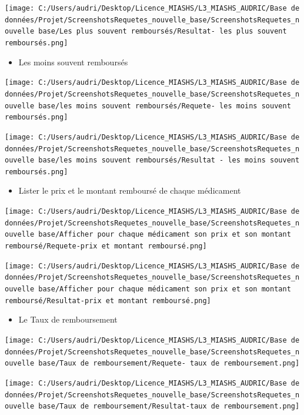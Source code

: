 \documentclass[mstat,12pt]{unswthesis}
\begin{document}
\texttt{[image: C:/Users/audri/Desktop/Licence\_MIASHS/L3\_MIASHS\_AUDRIC/Base de données/Projet/ScreenshotsRequetes\_nouvelle\_base/ScreenshotsRequetes\_nouvelle base/Les plus souvent remboursés/Resultat- les plus souvent remboursés.png]}

\begin{itemize}
\tightlist
\item
  Les moins souvent remboursés
\end{itemize}

\texttt{[image: C:/Users/audri/Desktop/Licence\_MIASHS/L3\_MIASHS\_AUDRIC/Base de données/Projet/ScreenshotsRequetes\_nouvelle\_base/ScreenshotsRequetes\_nouvelle base/les moins souvent remboursés/Requete- les moins souvent remboursés.png]}
\bigskip

\texttt{[image: C:/Users/audri/Desktop/Licence\_MIASHS/L3\_MIASHS\_AUDRIC/Base de données/Projet/ScreenshotsRequetes\_nouvelle\_base/ScreenshotsRequetes\_nouvelle base/les moins souvent remboursés/Resultat - les moins souvent remboursés.png]}

\begin{itemize}
\tightlist
\item
  Lister le prix et le montant remboursé de chaque médicament
\end{itemize}

\texttt{[image: C:/Users/audri/Desktop/Licence\_MIASHS/L3\_MIASHS\_AUDRIC/Base de données/Projet/ScreenshotsRequetes\_nouvelle\_base/ScreenshotsRequetes\_nouvelle base/Afficher pour chaque médicament son prix et son montant remboursé/Requete-prix et montant remboursé.png]}
\bigskip

\texttt{[image: C:/Users/audri/Desktop/Licence\_MIASHS/L3\_MIASHS\_AUDRIC/Base de données/Projet/ScreenshotsRequetes\_nouvelle\_base/ScreenshotsRequetes\_nouvelle base/Afficher pour chaque médicament son prix et son montant remboursé/Resultat-prix et montant remboursé.png]}

\bigskip

\begin{itemize}
\tightlist
\item
  Le Taux de remboursement
\end{itemize}

\texttt{[image: C:/Users/audri/Desktop/Licence\_MIASHS/L3\_MIASHS\_AUDRIC/Base de données/Projet/ScreenshotsRequetes\_nouvelle\_base/ScreenshotsRequetes\_nouvelle base/Taux de remboursement/Requete- taux de remboursement.png]}
\bigskip

\texttt{[image: C:/Users/audri/Desktop/Licence\_MIASHS/L3\_MIASHS\_AUDRIC/Base de données/Projet/ScreenshotsRequetes\_nouvelle\_base/ScreenshotsRequetes\_nouvelle base/Taux de remboursement/Resultat-taux de remboursement.png]}
\end{document}
